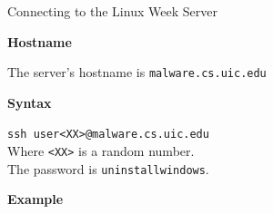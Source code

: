 \documentclass{beamer}
\begin{document}
\begin{frame}{Connecting to the Linux Week Server}
	\begin{Large}
		\textbf{Hostname} \\
	\end{Large}
	The server's hostname is \texttt{malware.cs.uic.edu}

	\vspace{0.3cm}

	\begin{Large}
		\textbf{Syntax} \\
	\end{Large}
	\texttt{ssh user<XX>@malware.cs.uic.edu} \\
	Where \texttt{<XX>} is a random number. \\
	The password is \texttt{uninstallwindows}.

	\vspace{0.3cm}

	\begin{Large}
		\textbf{Example} \\
	\end{Large}
	\inputminted{shell-session}{ssh-conn.txt}
\end{frame}
\end{document}
